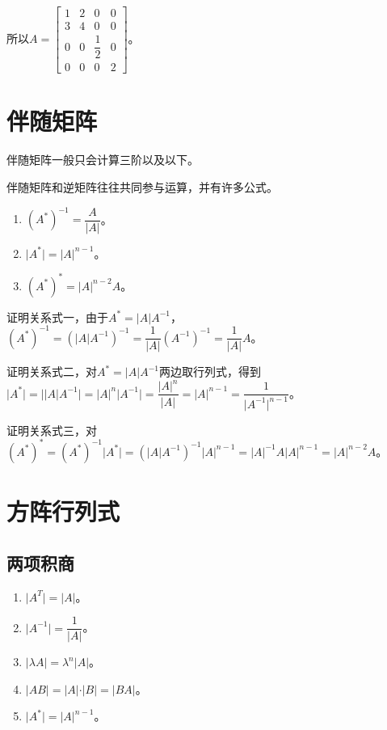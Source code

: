 \documentclass[UTF8, 12pt]{ctexart}
\begin{document}
所以$A=\left[\begin{array}{cccc}
    1 & 2 & 0 & 0 \\
    3 & 4 & 0 & 0 \\
    0 & 0 & \dfrac{1}{2} & 0 \\
    0 & 0 & 0 & 2
\end{array}\right]$。

\section{伴随矩阵}

伴随矩阵一般只会计算三阶以及以下。

伴随矩阵和逆矩阵往往共同参与运算，并有许多公式。

\begin{enumerate}
    \item $(A^*)^{-1}=\dfrac{A}{\vert A\vert}$。
    \item $\vert A^*\vert=\vert A\vert^{n-1}$。
    \item $(A^*)^*=\vert A\vert^{n-2}A$。
\end{enumerate}

证明关系式一，由于$A^*=\vert A\vert A^{-1}$，$(A^*)^{-1}=(\vert A\vert A^{-1})^{-1}=\dfrac{1}{\vert A\vert}(A^{-1})^{-1}=\dfrac{1}{\vert A\vert}A$。

证明关系式二，对$A^*=\vert A\vert A^{-1}$两边取行列式，得到$\vert A^*\vert=\vert\vert A\vert A^{-1}\vert=\vert A\vert^n\vert A^{-1}\vert=\dfrac{\vert A\vert^n}{\vert A\vert}=\vert A\vert^{n-1}=\dfrac{1}{\vert A^{-1}\vert^{n-1}}$。

证明关系式三，对$(A^*)^*=(A^*)^{-1}\vert A^*\vert=(\vert A\vert A^{-1})^{-1}\vert A\vert^{n-1}=\vert A\vert^{-1}A\vert A\vert^{n-1}=\vert A\vert^{n-2}A$。

\section{方阵行列式}

\subsection{两项积商}

\begin{enumerate}
    \item $\vert A^T\vert=\vert A\vert$。
    \item $\vert A^{-1}\vert=\dfrac{1}{\vert A\vert}$。
    \item $\vert\lambda A\vert=\lambda^n\vert A\vert$。
    \item $\vert AB\vert=\vert A\vert\cdot\vert B\vert=\vert BA\vert$。
    \item $\vert A^*\vert=\vert A\vert^{n-1}$。
\end{enumerate}
\end{document}
